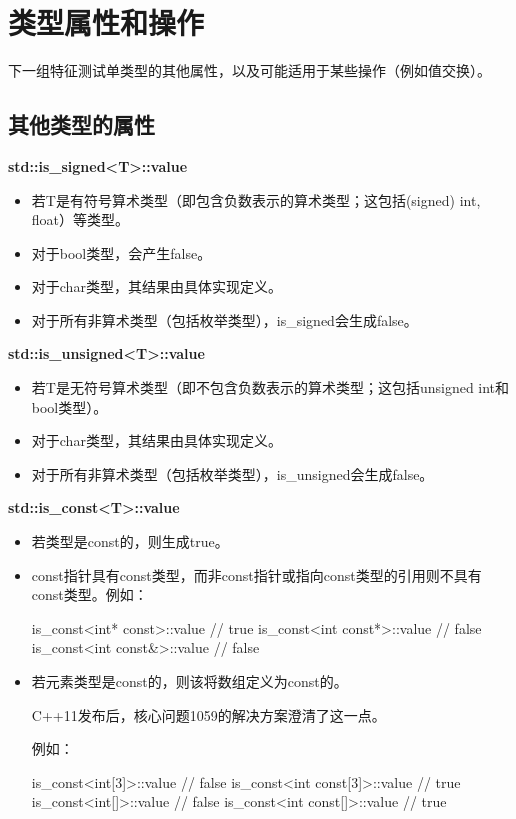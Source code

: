 \section{类型属性和操作}

下一组特征测试单类型的其他属性，以及可能适用于某些操作（例如值交换）。

\subsection{其他类型的属性}

\textbf{std::is\_signed<T>::value}

\begin{itemize}
\item 
若T是有符号算术类型（即包含负数表示的算术类型；这包括(signed) int, float）等类型。

\item 
对于bool类型，会产生false。

\item 
对于char类型，其结果由具体实现定义。

\item 
对于所有非算术类型（包括枚举类型），is\_signed会生成false。
\end{itemize}

\textbf{std::is\_unsigned<T>::value}

\begin{itemize}
\item 
若T是无符号算术类型（即不包含负数表示的算术类型；这包括unsigned int和bool类型）。

\item 
对于char类型，其结果由具体实现定义。

\item 
对于所有非算术类型（包括枚举类型），is\_unsigned会生成false。
\end{itemize}

\textbf{std::is\_const<T>::value}

\begin{itemize}
\item 
若类型是const的，则生成true。

\item 
const指针具有const类型，而非const指针或指向const类型的引用则不具有const类型。例如：
\begin{cpp}
is_const<int* const>::value // true
is_const<int const*>::value // false
is_const<int const&>::value // false
\end{cpp}

\item 
若元素类型是const的，则该将数组定义为const的。

\begin{notice}
C++11发布后，核心问题1059的解决方案澄清了这一点。
\end{notice}

例如：
\begin{cpp}
is_const<int[3]>::value // false
is_const<int const[3]>::value // true
is_const<int[]>::value // false
is_const<int const[]>::value // true
\end{cpp}

\end{itemize}


